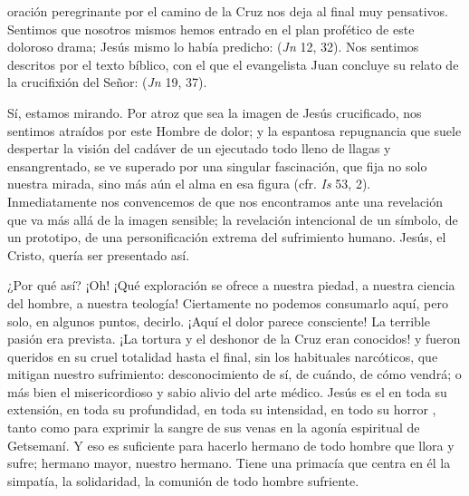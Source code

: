 \begin{body}
 oración peregrinante por el camino de la Cruz nos deja al final muy pensativos. Sentimos que nosotros mismos hemos entrado en el plan profético de este doloroso drama; Jesús mismo lo había predicho:  (\textit{Jn} 12, 32). Nos sentimos descritos por el texto bíblico, con el que el evangelista Juan concluye su relato de la crucifixión del Señor:  (\textit{Jn} 19, 37). 

Sí, estamos mirando. Por atroz que sea la imagen de Jesús crucificado, nos sentimos atraídos por este Hombre de dolor; y la espantosa repugnancia que suele despertar la visión del cadáver de un ejecutado todo lleno de llagas y ensangrentado, se ve superado por una singular fascinación, que fija no solo nuestra mirada, sino más aún el alma en esa figura  (cfr. \textit{Is} 53, 2). Inmediatamente nos convencemos de que nos encontramos ante una revelación que va más allá de la imagen sensible; la revelación intencional de un símbolo, de un prototipo, de una personificación extrema del sufrimiento humano. Jesús, el Cristo, quería ser presentado así. 

¿Por qué así? ¡Oh! ¡Qué exploración se ofrece a nuestra piedad, a nuestra ciencia del hombre, a nuestra teología! Ciertamente no podemos consumarlo aquí, pero solo, en algunos puntos, decirlo. ¡Aquí el dolor parece consciente! La terrible pasión era prevista. ¡La tortura y el deshonor de la Cruz eran conocidos! y fueron queridos en su cruel totalidad hasta el final, sin los habituales narcóticos, que mitigan nuestro sufrimiento: desconocimiento de sí, de cuándo, de cómo vendrá; o más bien el misericordioso y sabio alivio del arte médico. Jesús es el  en toda su extensión, en toda su profundidad, en toda su intensidad, en todo su horror , tanto como para exprimir la sangre de sus venas en la agonía espiritual de Getsemaní. Y eso es suficiente para hacerlo hermano de todo hombre que llora y sufre; hermano mayor, nuestro hermano. Tiene una primacía que centra en él la simpatía, la solidaridad, la comunión de todo hombre sufriente. 


\end{body}
